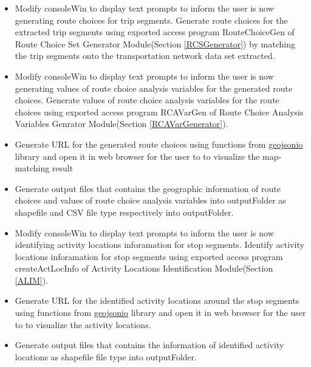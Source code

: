 \documentclass[12pt, titlepage]{article}
\begin{document}
\begin{itemize}
\begin{itemize}
    \item Modify consoleWin to display text prompts to inform the user \progname{} is now generating route choices for trip segments. Generate route choices for the extracted trip segments using exported access program RouteChoiceGen of Route Choice Set Generator Module(Section \ref{RCSGenerator}) by matching the trip segments onto the transportation network data set extracted.

    \item Modify consoleWin to display text prompts to inform the user \progname{} is now generating values of route choice analysis variables for the generated route choices. Generate values of route choice analysis variables for the route choices using exported access program RCAVarGen of Route Choice Analysis Variables Genrator Module(Section \ref{RCAVarGenerator}).

    \item Generate URL for the generated route choices using functions from \href{https://pypi.org/project/geojsonio/}{geojsonio} library and open it in web browser for the user to to visualize the map-matching result

    \item Generate output files that contains the geographic information of route choices and values of route choice analysis variables into outputFolder as shapefile and CSV file type respectively into outputFolder.
    
    \item Modify consoleWin to display text prompts to inform the user \progname{} is now identifying activity locations inforamation for stop segments. Identify activity locations inforamation for stop segments using exported access program createActLocInfo of Activity Locations Identification Module(Section \ref{ALIM}).

    \item Generate URL for the identified activity locations around the stop segments using functions from \href{https://pypi.org/project/geojsonio/}{geojsonio} library and open it in web browser for the user to to visualize the activity locations.

    \item Generate output files that contains the information of identified activity locations as shapefile file type into outputFolder.

\end{itemize}


\end{itemize}
\end{document}

